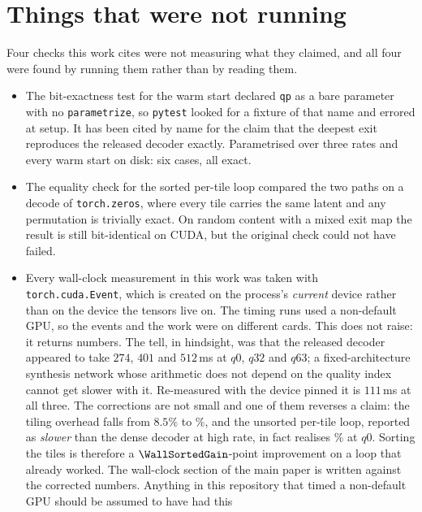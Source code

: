 \section{Things that were not running}

Four checks this work cites were not measuring what they claimed, and all four
were found by running them rather than by reading them.

\begin{itemize}\itemsep2pt
\item The bit-exactness test for the warm start declared \texttt{qp} as a bare
      parameter with no \texttt{parametrize}, so \texttt{pytest} looked for a
      fixture of that name and errored at setup. It has been cited by name for
      the claim that the deepest exit reproduces the released decoder exactly.
      Parametrised over three rates and every warm start on disk: six cases,
      all exact.
\item The equality check for the sorted per-tile loop compared the two paths on a
      decode of \texttt{torch.zeros}, where every tile carries the same latent
      and any permutation is trivially exact. On random content with a mixed exit
      map the result is still bit-identical on CUDA, but the original check could
      not have failed.
\item Every wall-clock measurement in this work was taken with
      \texttt{torch.cuda.Event}, which is created on the process's \emph{current}
      device rather than on the device the tensors live on. The timing runs used
      a non-default GPU, so the events and the work were on different cards.
      This does not raise: it returns numbers. The tell, in hindsight, was that
      the released decoder appeared to take $274$, $401$ and $512$\,ms at $q0$,
      $q32$ and $q63$; a fixed-architecture synthesis network whose
      arithmetic does not depend on the quality index cannot get slower with
      it. Re-measured with the device pinned it is $111$\,ms at all three. The
      corrections are not small and one of them reverses a claim: the tiling
      overhead falls from $8.5\%$ to \TilingOverhead\%, and the unsorted
      per-tile loop, reported as \emph{slower} than the dense decoder at high
      rate, in fact realises \WallMasked\% at $q0$. Sorting the tiles is
      therefore a $\WallSortedGain$-point improvement on a loop that already
      worked. The wall-clock section of the main paper is written against the
      corrected numbers. Anything in this
      repository that timed a non-default GPU should be assumed to have had this

\end{itemize}
